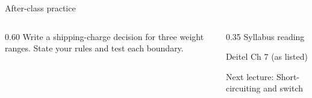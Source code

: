 \documentclass[10pt,aspectratio=169]{beamer}
\begin{document}
\begin{frame}[fragile,t]{After-class practice}
\begin{columns}[T,onlytextwidth]\begin{column}{0.60\textwidth}
Write a shipping-charge decision for three weight ranges. State your rules and test each boundary.
\end{column}\begin{column}{0.35\textwidth}\small
Syllabus reading\par Deitel Ch 7 (as listed)

Next lecture: Short-circuiting and switch
\end{column}\end{columns}
\end{frame}
\end{document}
